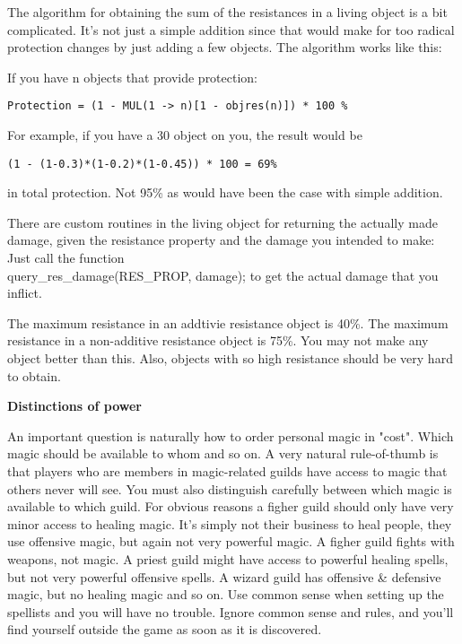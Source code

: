 The algorithm for obtaining the sum of the resistances in a living
object is a bit complicated. It's not just a simple addition since
that would make for too radical protection changes by just adding a
few objects. The algorithm works like this:

If you have n objects that provide protection:

\begin{verbatim}
Protection = (1 - MUL(1 -> n)[1 - objres(n)]) * 100 %
\end{verbatim}

For example, if you have a 30%
object on you, the result would be
\begin{verbatim}
(1 - (1-0.3)*(1-0.2)*(1-0.45)) * 100 = 69%
\end{verbatim}
in total protection. Not 95\% as would have been the case
with simple addition.

There are custom routines in the living object for returning the
actually made damage, given the resistance property and the damage you
intended to make: Just call the function \\ query\_res\_damage(RES\_PROP,
damage); to get the actual damage that you inflict.

The maximum resistance in an addtivie resistance object is 40\%. The
maximum resistance in a non-additive resistance object is 75\%. You may
not make any object better than this. Also, objects with so high
resistance should be very hard to obtain.

{\bf Distinctions of power}


An important question is naturally how to order personal magic in
"cost". Which magic should be available to whom and so on. A very
natural rule-of-thumb is that players who are members in magic-related
guilds have access to magic that others never will see. You must also
distinguish carefully between which magic is available to which guild.
For obvious reasons a figher guild should only have very minor access
to healing magic. It's simply not their business to heal people, they
use offensive magic, but again not very powerful magic. A figher guild
fights with weapons, not magic. A priest guild might have access to
powerful healing spells, but not very powerful offensive spells. A
wizard guild has offensive \& defensive magic, but no healing magic and
so on. Use common sense when setting up the spellists and you will
have no trouble. Ignore common sense and rules, and you'll find
yourself outside the game as soon as it is discovered.

